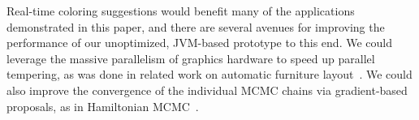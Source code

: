 Real-time coloring suggestions would benefit many of the applications demonstrated in this paper, and there are several avenues for improving the performance of our unoptimized, JVM-based prototype to this end. We could leverage the massive parallelism of graphics hardware to speed up parallel tempering, as was done in related work on automatic furniture layout~\cite{MerrellFurnitureLayout}. We could also improve the convergence of the individual MCMC chains via gradient-based proposals, as in Hamiltonian MCMC~\cite{HamiltonianMCMC}.
